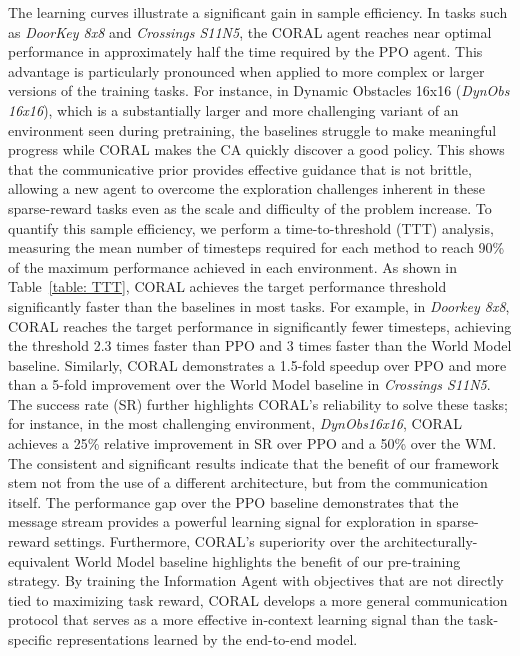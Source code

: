 \documentclass[letterpaper]{article}
\begin{document}
The learning curves illustrate a significant gain in sample efficiency. In tasks such as \textit{DoorKey 8x8} and \textit{Crossings S11N5}, the CORAL agent reaches near optimal performance in approximately half the time required by the PPO agent. This advantage is particularly pronounced when applied to more complex or larger versions of the training tasks. For instance, in Dynamic Obstacles 16x16 (\textit{DynObs 16x16}), which is a substantially larger and more challenging variant of an environment seen during pretraining, the baselines struggle to make meaningful progress while CORAL makes the CA quickly discover a good policy. This shows that the communicative prior provides effective guidance that is not brittle, allowing a new agent to overcome the exploration challenges inherent in these sparse-reward tasks even as the scale and difficulty of the problem increase.
To quantify this sample efficiency, we perform a time-to-threshold (TTT) analysis, measuring the mean number of timesteps required for each method to reach 90\% of the maximum performance achieved in each environment. As shown in Table~\ref{table: TTT}, CORAL achieves the target performance threshold significantly faster than the baselines in most tasks. For example, in \textit{Doorkey 8x8}, CORAL reaches the target performance in significantly fewer timesteps, achieving the threshold 2.3 times faster than PPO and 3 times faster than the World Model baseline. Similarly, CORAL demonstrates a 1.5-fold speedup over PPO and more than a 5-fold improvement over the World Model baseline in \textit{Crossings S11N5}. The success rate (SR) further highlights CORAL's reliability to solve these tasks; for instance, in the most challenging environment, \textit{DynObs16x16}, CORAL achieves a 25\% relative improvement in SR over PPO and a 50\% over the WM.
The consistent and significant results indicate that the benefit of our framework stem not from the use of a different architecture, but from the communication itself. The performance gap over the PPO baseline demonstrates that the message stream provides a powerful learning signal for exploration in sparse-reward settings. Furthermore, CORAL's superiority over the architecturally-equivalent World Model baseline highlights the benefit of our pre-training strategy. By training the Information Agent with objectives that are not directly tied to maximizing task reward, CORAL develops a more general communication protocol that serves as a more effective in-context learning signal than the task-specific representations learned by the end-to-end model.
\end{document}
